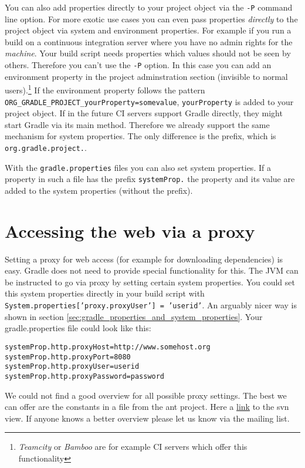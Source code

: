You can also add properties directly to your project object via the \texttt{-P} command line option. For more exotic use cases you can even pass properties \emph{directly} to the project object via system and environment properties. For example if you run a build on a continuous integration server where you have no admin rights for the \emph{machine}. Your build script needs properties which values should not be seen by others. Therefore you can't use the \texttt{-P} option. In this case you can add an environment property in the project adminstration section (invisible to normal users).\footnote{\emph{Teamcity} or \emph{Bamboo} are for example CI servers which offer this functionality} If the environment property follows the pattern \texttt{ORG\_GRADLE\_PROJECT\_yourProperty=somevalue}, \texttt{yourProperty} is added to your project object. If in the future CI servers support Gradle directly, they might start Gradle via its main method. Therefore we already support the same mechanism for system properties. The only difference is the prefix, which is \texttt{org.gradle.project.}.

With the \texttt{gradle.properties} files you can also set system properties. If a property in such a file has the prefix \texttt{systemProp.} the property and its value are added to the system properties (without the prefix).

\section{Accessing the web via a proxy} %
\label{sec:accessing_the_web_via_a_proxy}
Setting a proxy for web access (for example for downloading dependencies) is easy. Gradle does not need to provide special functionality for this. The JVM can be instructed to go via proxy by setting certain system properties. You could set this system properties directly in your build script with \texttt{System.properties['proxy.proxyUser'] = 'userid'}. An arguably nicer way is shown in section \ref{sec:gradle_properties_and_system_properties}. Your gradle.properties file could look like this:
\begin{Verbatim}
systemProp.http.proxyHost=http://www.somehost.org
systemProp.http.proxyPort=8080
systemProp.http.proxyUser=userid
systemProp.http.proxyPassword=password	
\end{Verbatim}
We could not find a good overview for all possible proxy settings. The best we can offer are the constants in a file from the ant project. Here a \href{http://svn.apache.org/viewvc/ant/core/trunk/src/main/org/apache/tools/ant/util/ProxySetup.java?view=markup&pathrev=556977}{link} to the svn view. If anyone knows a better overview please let us know via the mailing list.  




